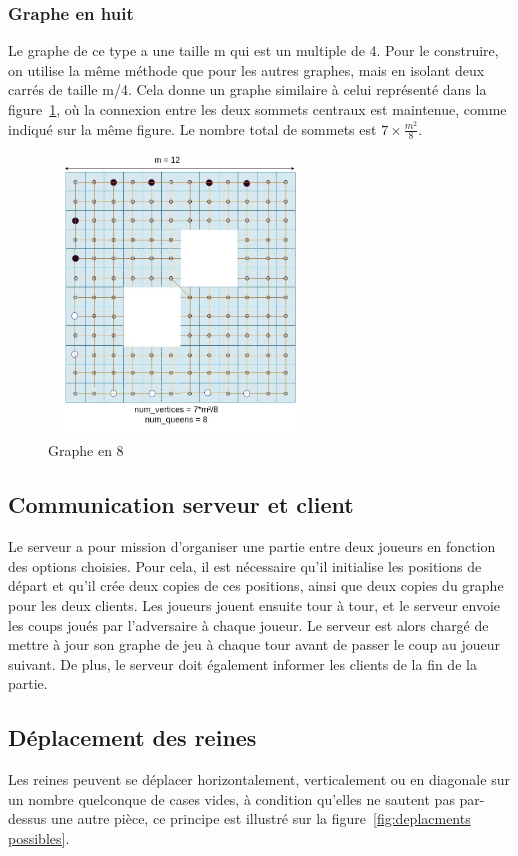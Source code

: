 \documentclass[11pt]{article}
\begin{document}
            \subsubsection{Graphe en huit}
           Le graphe de ce type a une taille m qui est un multiple de 4. Pour le construire, on utilise la même méthode que pour les autres graphes, mais en isolant deux carrés de taille m/4. Cela donne un graphe similaire à celui représenté dans la figure~\ref{fig:graph8}, où la connexion entre les deux sommets centraux est maintenue, comme indiqué sur la même figure. Le nombre total de sommets est $7\times \frac{m^{2}}{8}$.
            \begin{figure}[h]
                \centering
                \includegraphics[width = 7cm, height = 7.5cm]{graphe_en8 (3).jpg}
                \caption{Graphe en 8}
                \label{fig:graph8}
            \end{figure}
            \newpage
        \subsection{Communication serveur et client}
        Le serveur a pour mission d'organiser une partie entre deux joueurs en fonction des options choisies. Pour cela, il est nécessaire qu'il initialise les positions de départ et qu'il crée deux copies de ces positions, ainsi que deux copies du graphe pour les deux clients. Les joueurs jouent ensuite tour à tour, et le serveur envoie les coups joués par l'adversaire à chaque joueur. Le serveur est alors chargé de mettre à jour son graphe de jeu à chaque tour avant de passer le coup au joueur suivant. De plus, le serveur doit également informer les clients de la fin de la partie.
        \subsection{Déplacement des reines}
        Les reines peuvent se déplacer horizontalement, verticalement ou en diagonale sur un nombre quelconque de cases vides, à condition qu'elles ne sautent pas par-dessus une autre pièce, ce principe est illustré sur la figure~\ref{fig:deplacments possibles}. 
        
\end{document}

